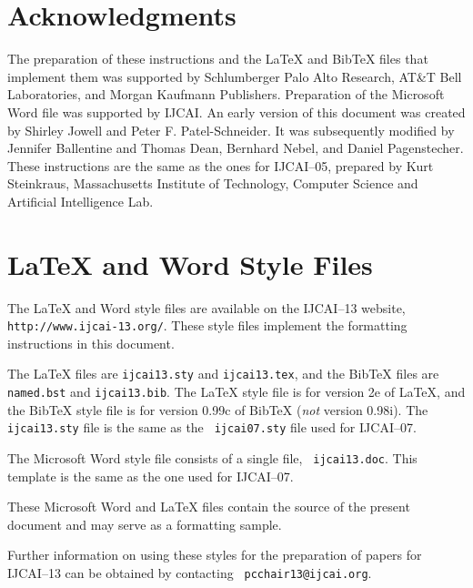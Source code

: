 \documentclass{article}
\numberwithin{equation}{section}
\begin{document}
\section*{Acknowledgments}

The preparation of these instructions and the \LaTeX{} and Bib\TeX{}
files that implement them was supported by Schlumberger Palo Alto
Research, AT\&T Bell Laboratories, and Morgan Kaufmann Publishers.
Preparation of the Microsoft Word file was supported by IJCAI.  An
early version of this document was created by Shirley Jowell and Peter
F. Patel-Schneider.  It was subsequently modified by Jennifer
Ballentine and Thomas Dean, Bernhard Nebel, and Daniel Pagenstecher.
These instructions are the same as the ones for IJCAI--05, prepared by
Kurt Steinkraus, Massachusetts Institute of Technology, Computer
Science and Artificial Intelligence Lab.

\appendix

\section{\LaTeX{} and Word Style Files}\label{stylefiles}

The \LaTeX{} and Word style files are available on the IJCAI--13
website, {\tt http://www.ijcai-13.org/}.
These style files implement the formatting instructions in this
document.

The \LaTeX{} files are {\tt ijcai13.sty} and {\tt ijcai13.tex}, and
the Bib\TeX{} files are {\tt named.bst} and {\tt ijcai13.bib}. The
\LaTeX{} style file is for version 2e of \LaTeX{}, and the Bib\TeX{}
style file is for version 0.99c of Bib\TeX{} ({\em not} version
0.98i). The {\tt ijcai13.sty} file is the same as the {\tt
ijcai07.sty} file used for IJCAI--07.

The Microsoft Word style file consists of a single file, {\tt
ijcai13.doc}. This template is the same as the one used for
IJCAI--07.

These Microsoft Word and \LaTeX{} files contain the source of the
present document and may serve as a formatting sample.

Further information on using these styles for the preparation of
papers for IJCAI--13 can be obtained by contacting {\tt
pcchair13@ijcai.org}.



\end{document}
